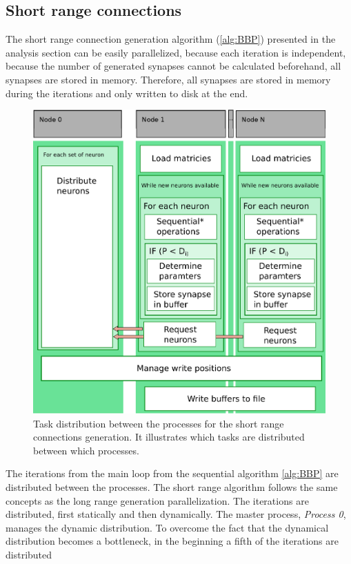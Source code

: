 \subsection{Short range connections}
The short range connection generation algorithm (\ref{alg:BBP}) presented in the analysis section can be easily parallelized,
because each iteration is independent, because the number of generated synapses cannot be calculated beforehand, all synapses are stored in memory.
Therefore, all synapses are stored in memory during the iterations and only written to disk 
at the end.
\begin{figure}[ht!]
\centering
\includegraphics[scale=0.5]{pictures/shortRange_parallelAlg.eps}
\caption{Task distribution between the processes for the short range connections generation.
It illustrates which tasks are distributed between which processes.}
\label{fig:shortrangeparallel}
\end{figure}
The iterations from the main loop from the sequential algorithm \ref{alg:BBP} are distributed between the processes.
The short range algorithm follows the same concepts as the long range generation parallelization.
The iterations are distributed, first statically and then dynamically.
The master process, \emph{Process 0}, manages the dynamic distribution.
To overcome the fact that the dynamical distribution becomes a bottleneck, in the beginning a fifth of the iterations are distributed
